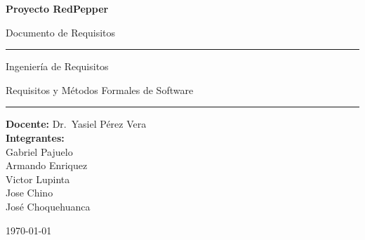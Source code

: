 



\begin{titlepage}
  \centering
  \vspace*{2.0cm}

  {\Huge\bfseries Proyecto RedPepper\par}
  \vspace{0.6cm}
  {\LARGE Documento de Requisitos\par}

  \vspace{2.2cm}
  \rule{\linewidth}{0.4pt}\par
  \vspace{0.6cm}
  {\large Ingeniería de Requisitos\par}
  {\large Requisitos y Métodos Formales de Software\par}
  \vspace{0.6cm}
  \rule{\linewidth}{0.4pt}\par

  \vfill

  \begin{minipage}{0.82\linewidth}
    \centering
    \textbf{Docente:} Dr.\ Yasiel Pérez Vera\\[0.8em]
    \textbf{Integrantes:}\\[0.3em]
    Gabriel Pajuelo\\
    Armando Enriquez\\
    Victor Lupinta\\
    Jose Chino\\
    José Choquehuanca
  \end{minipage}

  \vfill

  {\large \today\par}
\end{titlepage}

\tableofcontents
\newpage









